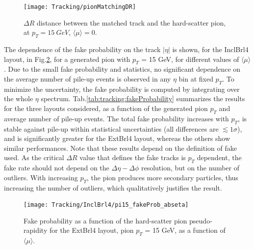 \documentclass[a4paper,twoside,12pt]{book}
\begin{document}
\begin{figure}
\centering
\texttt{[image: Tracking/pionMatchingDR]}
\caption{$\Delta R$ distance between the matched track and the hard-scatter pion, at $p_{T} = 15\ GeV$, $\langle\mu\rangle = 0$.} 
\label{fig:tracking:pionMatchingDR}
\end{figure}

The dependence of the fake probability on the track $|\eta|$ is shown, for the InclBrl4 layout, in Fig.\ref{fig:tracking:fakeProbability}, for a generated pion with $p_{T}$ = 15 GeV, for 
different values of $\langle\mu\rangle$. Due to the small fake probability and statistics, no significant dependence on the average number of pile-up events is observed in any $\eta$ bin at fixed $p_{T}$. To minimize
the uncertainty, the fake probability is computed by integrating over the whole $\eta$ spectrum. Tab.\ref{tab:tracking:fakeProbability} summarizes the results for the three layouts considered, as a function of the generated pion $p_{T}$ and average number of pile-up events. The total fake probability increases with $p_{T}$, is stable against pile-up within
statistical uncertainties (all differences are $\lesssim 1 \sigma$), and is significantly
greater for the ExtBrl4 layout, whereas the others show similar performances. Note that 
these results depend on the definition of fake used. As the critical $\Delta R$ value that defines
the fake tracks is $p_{T}$ dependent, the fake rate should not depend on the $\Delta\eta-\Delta\phi$ resolution, but on the number of outliers. With increasing $p_{T}$, 
the pion produces more secondary particles, thus increasing the number of outliers, 
which qualitatively justifies the result.\\ 

\begin{figure}
\centering
\texttt{[image: Tracking/InclBrl4/pi15\_fakeProb\_abseta]}
\caption{Fake probability as a function of the hard-scatter pion pseudo-rapidity for the ExtBrl4 layout, pion $p_{T}$ = 15 GeV, as a function of $\langle\mu\rangle$.} 
\label{fig:tracking:fakeProbability}
\end{figure}
\end{document}
